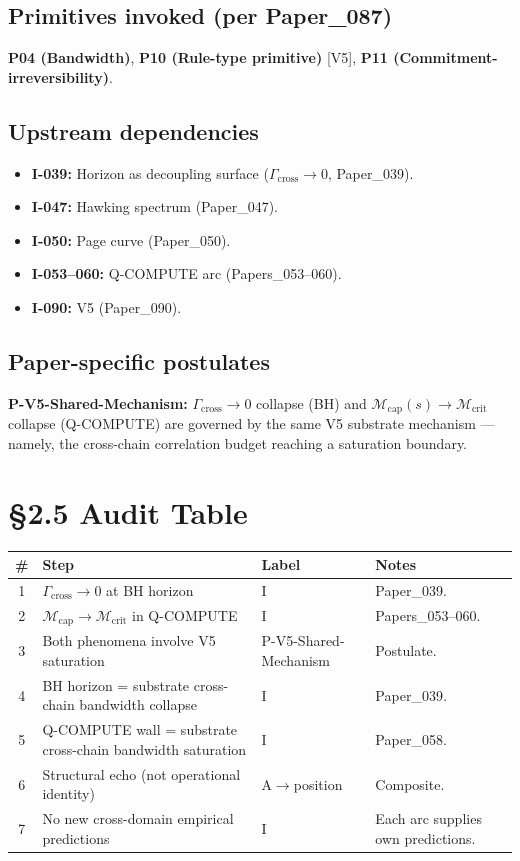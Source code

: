\documentclass[11pt,a4paper]{article}
\begin{document}
\subsection{Primitives invoked (per Paper\_087)}

\textbf{P04 (Bandwidth)}, \textbf{P10 (Rule-type primitive)} [V5], \textbf{P11 (Commitment-irreversibility)}.

\subsection{Upstream dependencies}

\begin{itemize}[noitemsep]
\item \textbf{I-039:} Horizon as decoupling surface ($\Gamma_\mathrm{cross} \to 0$, Paper\_039).
\item \textbf{I-047:} Hawking spectrum (Paper\_047).
\item \textbf{I-050:} Page curve (Paper\_050).
\item \textbf{I-053--060:} Q-COMPUTE arc (Papers\_053--060).
\item \textbf{I-090:} V5 (Paper\_090).
\end{itemize}

\subsection{Paper-specific postulates}

\textbf{P-V5-Shared-Mechanism:} $\Gamma_\mathrm{cross} \to 0$ collapse (BH) and $\mathcal{M}_\mathrm{cap}(s) \to \mathcal{M}_\mathrm{crit}$ collapse (Q-COMPUTE) are governed by the same V5 substrate mechanism --- namely, the cross-chain correlation budget reaching a saturation boundary.

\section*{\S2.5 Audit Table}

\begin{center}
\begin{tabular}{cllp{}}
\toprule
\textbf{\#} & \textbf{Step} & \textbf{Label} & \textbf{Notes} \\
\midrule
1 & $\Gamma_\mathrm{cross} \to 0$ at BH horizon & I & Paper\_039. \\
2 & $\mathcal{M}_\mathrm{cap} \to \mathcal{M}_\mathrm{crit}$ in Q-COMPUTE & I & Papers\_053--060. \\
3 & Both phenomena involve V5 saturation & P-V5-Shared-Mechanism & Postulate. \\
4 & BH horizon = substrate cross-chain bandwidth collapse & I & Paper\_039. \\
5 & Q-COMPUTE wall = substrate cross-chain bandwidth saturation & I & Paper\_058. \\
6 & Structural echo (not operational identity) & A$\to$position & Composite. \\
7 & No new cross-domain empirical predictions & I & Each arc supplies own predictions. \\
\bottomrule
\end{tabular}
\end{center}
\end{document}
